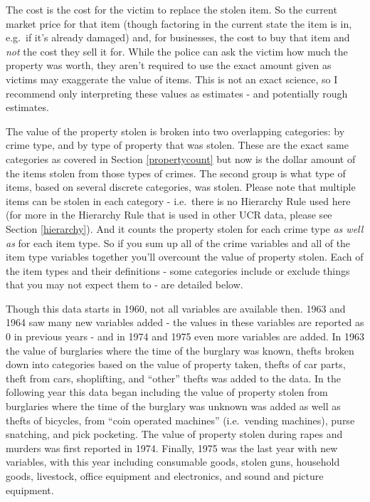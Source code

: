 \documentclass[
  12pt,
  openany]{book}
\begin{document}
The cost is the cost for the victim to replace the stolen item. So the current market price for that item (though factoring in the current state the item is in, e.g.~if it's already damaged) and, for businesses, the cost to buy that item and \emph{not} the cost they sell it for. While the police can ask the victim how much the property was worth, they aren't required to use the exact amount given as victims may exaggerate the value of items. This is not an exact science, so I recommend only interpreting these values as estimates - and potentially rough estimates.

The value of the property stolen is broken into two overlapping categories: by crime type, and by type of property that was stolen. These are the exact same categories as covered in Section \ref{propertycount} but now is the dollar amount of the items stolen from those types of crimes. The second group is what type of items, based on several discrete categories, was stolen. Please note that multiple items can be stolen in each category - i.e.~there is no Hierarchy Rule used here (for more in the Hierarchy Rule that is used in other UCR data, please see Section \ref{hierarchy}). And it counts the property stolen for each crime type \emph{as well as} for each item type. So if you sum up all of the crime variables and all of the item type variables together you'll overcount the value of property stolen. Each of the item types and their definitions - some categories include or exclude things that you may not expect them to - are detailed below.

Though this data starts in 1960, not all variables are available then. 1963 and 1964 saw many new variables added - the values in these variables are reported as 0 in previous years - and in 1974 and 1975 even more variables are added. In 1963 the value of burglaries where the time of the burglary was known, thefts broken down into categories based on the value of property taken, thefts of car parts, theft from cars, shoplifting, and ``other'' thefts was added to the data. In the following year this data began including the value of property stolen from burglaries where the time of the burglary was unknown was added as well as thefts of bicycles, from ``coin operated machines'' (i.e.~vending machines), purse snatching, and pick pocketing. The value of property stolen during rapes and murders was first reported in 1974. Finally, 1975 was the last year with new variables, with this year including consumable goods, stolen guns, household goods, livestock, office equipment and electronics, and sound and picture equipment.
\end{document}
